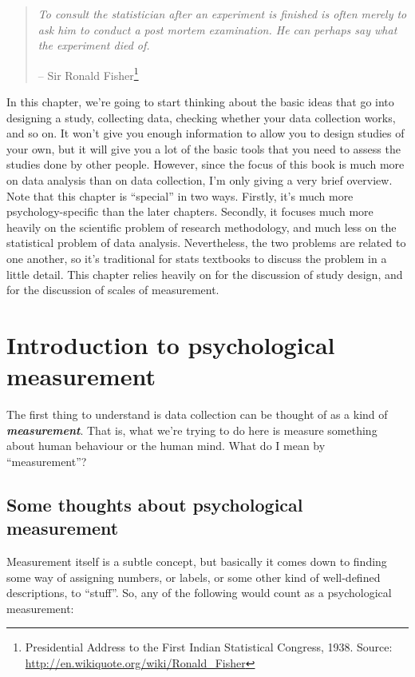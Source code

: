\documentclass[
]{book}
\begin{document}
\begin{quote}
\emph{To consult the statistician after an experiment is finished is often merely to ask him to conduct a post mortem examination. He can perhaps say what the experiment died of.}

-- Sir Ronald Fisher\footnote{Presidential Address to the First Indian Statistical Congress, 1938. Source: \url{http://en.wikiquote.org/wiki/Ronald_Fisher}}
\end{quote}

In this chapter, we're going to start thinking about the basic ideas that go into designing a study, collecting data, checking whether your data collection works, and so on. It won't give you enough information to allow you to design studies of your own, but it will give you a lot of the basic tools that you need to assess the studies done by other people. However, since the focus of this book is much more on data analysis than on data collection, I'm only giving a very brief overview. Note that this chapter is ``special'' in two ways. Firstly, it's much more psychology-specific than the later chapters. Secondly, it focuses much more heavily on the scientific problem of research methodology, and much less on the statistical problem of data analysis. Nevertheless, the two problems are related to one another, so it's traditional for stats textbooks to discuss the problem in a little detail. This chapter relies heavily on \citet{Campbell1963} for the discussion of study design, and \citet{Stevens1946} for the discussion of scales of measurement.

\hypertarget{measurement}{%
\section{Introduction to psychological measurement}\label{measurement}}

The first thing to understand is data collection can be thought of as a kind of \textbf{\emph{measurement}}. That is, what we're trying to do here is measure something about human behaviour or the human mind. What do I mean by ``measurement''?

\hypertarget{some-thoughts-about-psychological-measurement}{%
\subsection{Some thoughts about psychological measurement}\label{some-thoughts-about-psychological-measurement}}

Measurement itself is a subtle concept, but basically it comes down to finding some way of assigning numbers, or labels, or some other kind of well-defined descriptions, to ``stuff''. So, any of the following would count as a psychological measurement:
\end{document}
